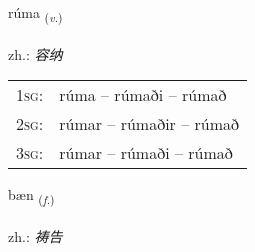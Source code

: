 \documentclass[frontgrid, backgrid]{flacards}\usepackage[]{graphicx}\usepackage[]{xcolor}
\begin{document}
\renewcommand{\flhead}{\vskip5pt \fboxsep=0pt {\small\bfseries\footnotesize Sagnorð | 动词}}
\renewcommand{\fcfoot}{\vskip5pt \fboxsep=0pt \hspace{2pt}{\small\bfseries\footnotesize 3K}}

\renewcommand{\blhead}{\vskip5pt {\small\bfseries\footnotesize Sagnorð | 动词 }}
\renewcommand{\bcfoot}{\vskip5pt \hspace{2pt}{\small\bfseries\footnotesize 3K}}


{rúma \small{\textsubscript{(\textit{v.})}} \\[1ex] %
\textphonetic{[ruːma]} \\
zh.: \emph{容纳} \\  [2ex]
\renewcommand*{\arraystretch}{0.8}
\begin{tabular}{p{1cm}l}
\textsc{1sg}: & rúma -- rúmaði -- rúmað \\ 
\textsc{2sg}: & rúmar -- rúmaðir -- rúmað \\ 
\textsc{3sg}: & rúmar -- rúmaði -- rúmað \\ 
\end{tabular}
}

\renewcommand{\flhead}{\vskip5pt \fboxsep=0pt {\small\bfseries\footnotesize Nafnorð | 名词}}
\renewcommand{\fcfoot}{\vskip5pt \fboxsep=0pt \hspace{2pt}{\small\bfseries\footnotesize 3K}}

\renewcommand{\blhead}{\vskip5pt {\small\bfseries\footnotesize Nafnorð | 名词 }}
\renewcommand{\bcfoot}{\vskip5pt \hspace{2pt}{\small\bfseries\footnotesize 3K}}


{bæn \small{\textsubscript{(\textit{f.})}} \\[1ex] %
\textphonetic{[paiːn]} \\
zh.: \emph{祷告} \\  [2ex]
\renewcommand*{\arraystretch}{0.8}
}
\end{document}
